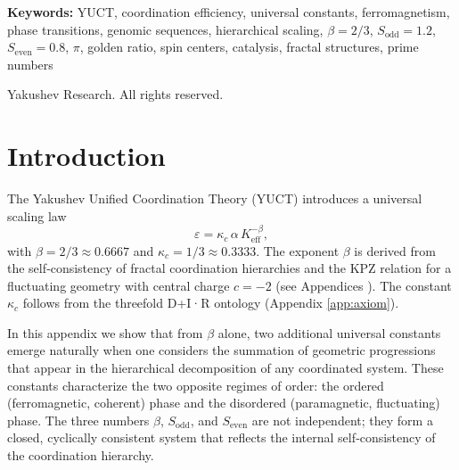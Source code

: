 \documentclass[12pt,a4paper]{article}
\begin{document}
\begin{titlepage}
\begin{center}
\begin{minipage}{0.9\textwidth}
\begin{abstract}
					Additionally, the same constants emerge in the asymptotic distribution of prime numbers, providing an independent, quantitative verification of YUCT: the theoretical correction to Rosser's formula for the \(n\)-th prime is \(-\frac{S_{\text{even}}}{2}n^{1-\beta}\ln n\) (Appendix~PrimeN). The existence of such a self‑consistent structure demonstrates the predictive power of YUCT and provides a new quantitative language for describing order–disorder transitions across all scales.
				\end{abstract}
			\end{minipage}
			
			\vspace{1cm}
			\noindent
			\small\textbf{Keywords:} YUCT, coordination efficiency, universal constants, ferromagnetism, phase transitions, genomic sequences, hierarchical scaling, \(\beta = 2/3\), \(S_{\text{odd}} = 1.2\), \(S_{\text{even}} = 0.8\), \(\pi\), golden ratio, spin centers, catalysis, fractal structures, prime numbers
			
			\vspace{0.5cm}
			\noindent
			 Yakushev Research. All rights reserved.
		\end{center}
	\end{titlepage}
	
	\tableofcontents
	\newpage
	
	\section{Introduction}
	The Yakushev Unified Coordination Theory (YUCT) introduces a universal scaling law
	\[
	\varepsilon = \kappa_c \, \alpha \, K_{\mathrm{eff}}^{-\beta},
	\]
	with \(\beta = 2/3 \approx 0.6667\) and \(\kappa_c = 1/3 \approx 0.3333\). The exponent \(\beta\) is derived from the self‑consistency of fractal coordination hierarchies and the KPZ relation for a fluctuating geometry with central charge \(c = -2\) (see Appendices \cite{AppendixL, AppendixY}). The constant \(\kappa_c\) follows from the threefold D+I·R ontology (Appendix \ref{app:axiom}).
	
	In this appendix we show that from \(\beta\) alone, two additional universal constants emerge naturally when one considers the summation of geometric progressions that appear in the hierarchical decomposition of any coordinated system. These constants characterize the two opposite regimes of order: the ordered (ferromagnetic, coherent) phase and the disordered (paramagnetic, fluctuating) phase. The three numbers \(\beta\), \(S_{\text{odd}}\), and \(S_{\text{even}}\) are not independent; they form a closed, cyclically consistent system that reflects the internal self‑consistency of the coordination hierarchy.
	
\end{document}
